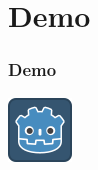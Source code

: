 \documentclass[ascpectratio=169]{beamer}
\begin{document}

\section{Demo}


\begin{frame}

  \frametitle{Demo}

  \begin{center}
    \includegraphics[scale=1.5]{../../Preparation/icon.png}
  \end{center}

\end{frame}

\end{document}
